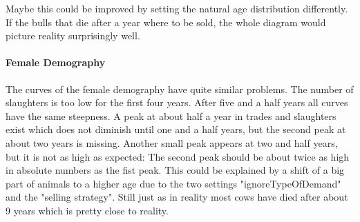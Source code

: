 Maybe this could be improved by setting the natural age distribution differently. If the bulls that die after a year where to be sold, the whole diagram would picture reality surprisingly well.  
\paragraph{Female Demography}
The curves of the female demography have quite similar problems. The number of slaughters is too low for the first four years. After five and a half years all curves have the same steepness. 
A peak at about half a year in trades and slaughters exist which does not diminish until one and a half years, but the second peak at about two years is missing. Another small peak appears at two and half years, but it is not as high as expected: The second peak should be about twice as high in absolute numbers as the fist peak. 
This could be explained by a shift of a big part of animals to a higher age due to the two settings "ignoreTypeOfDemand" and the "selling strategy". Still just as in reality most cows have died after about 9 years which is pretty close to reality.

